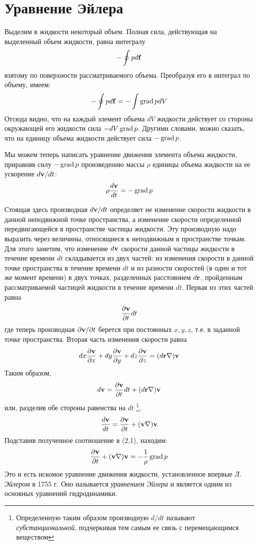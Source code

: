 \section{Уравнение Эйлера}
\label{sec:p2}

Выделим в жидкости некоторый объем. Полная сила, действующая на выделенный
объем жидкости, равна интегралу
\[
   - \oint p d \mathbf{f}
\]
взятому по поверхности рассматриваемого объема. Преобразуя его в интеграл
по объему, имеем:
\[
   - \oint p d \mathbf{f} = - \int \mathop{\mathrm{grad}}\nolimits p dV
\]
Отсюда видно, что на каждый элемент объема $dV$ жидкости действует со стороны
окружающей его жидкости сила $-dV \mathop{\mathrm{grad}}\nolimits p$. Другими словами, можно сказать,
что на единицу объема жидкости действует сила $-\mathop{\mathrm{grad}}\nolimits p$.

Мы можем теперь написать уравнение движения элемента объема жидкости,
приравняв силу $- \mathop{\mathrm{grad}}\nolimits p$ произведению массы $\rho$ единицы объема жидкости
на ее ускорение $d \mathbf{v} / dt$:
\begin{equation}
   \label{eq:2.1}
   \rho \frac{d \mathbf{v}}{dt} = - \mathop{\mathrm{grad}}\nolimits p
\end{equation}

Стоящая здесь производная $d \mathbf{v} / dt$ определяет не изменение скорости
жидкости в данной неподвижной точке пространства, а изменение скорости
определенной передвигающейся в пространстве частицы жидкости. Эту производную
надо выразить через величины, относящиеся к неподвижным в пространстве точкам.
Для этого заметим, что изменение $d \mathbf{v}$ скорости данной частицы жидкости в
течение времени $dt$ складывается из двух частей: из изменения скорости в данной
точке пространства в течение времени $dt$ и из разности скоростей (в один и тот
же момент времени) в двух точках, разделенных расстоянием $d \mathbf{r}$,
пройденным рассматриваемой частицей жидкости в течение времени $dt$. Первая нз
этих частей равна
\[
   \frac{\partial \mathbf{v}}{\partial t}dt
\]
где теперь производная $\partial \mathbf{v} / \partial t$ берется при постоянных
$x,y,z$, т.е. в заданной точке пространства. Вторая часть изменения скорости
равна
\[
   d{x} \frac{\partial \mathbf{v}}{\partial{x}}+d{y} \frac{\partial \mathbf{v}}{\partial{y}}+d{z} \frac{\partial \mathbf{v}}{\partial{z}} = (d \mathbf{r} \nabla) \mathbf{v}
\]
Таким образом,
\[
   d {\mathbf{v}} = \frac{\partial{ \mathbf{v} }}{\partial t}dt + (d \mathbf{r} \nabla) \mathbf{v}
\]
или, разделив обе стороны равенства на $dt$ \footnote{Определенную таким образом
производную $d/dt$ называют \textit{субстанциональной}, подчеркивая тем самым
ее связь с перемещающимся веществом},
\begin{equation}
   \label{eq:2.2}
   \frac{d {\mathbf{v}}}{dt} = \frac{\partial { \mathbf{v} }}{\partial t} + ({\mathbf{v}} \nabla) {\mathbf{v}}
\end{equation}
Подставив полученное соотношение в (2,1), находим:
\begin{equation}
   \label{eq:2.3}
   \frac{\partial{ \mathbf{v} }}{\partial t}+({\mathbf{v}} \nabla) {\mathbf{v}} = - \frac1{\rho} \mathop{\mathrm{grad}}\nolimits p
\end{equation}
Это и есть искомое уравнение движения жидкости, установленное впервые \textit{Л.
Эйлером} в 1755 г. Оно называется \textit{уравнением Эйлера} и является одним из
основных уравнений гидродинамики.

